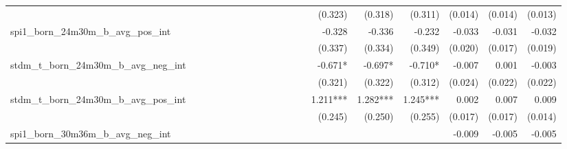 \begin{tabular}{lrrrrrrrrrrrrrrrrrr}
                                            &              &              &              &              &              &              &              &              &               &              &              &               &      (0.323) &      (0.318) &       (0.311) &      (0.014) &      (0.014) &       (0.013) \\ 
spi1\_born\_24m30m\_b\_avg\_pos\_int        &              &              &              &              &              &              &              &              &               &              &              &               &       -0.328 &       -0.336 &        -0.232 &       -0.033 &       -0.031 &        -0.032 \\ 
                                            &              &              &              &              &              &              &              &              &               &              &              &               &      (0.337) &      (0.334) &       (0.349) &      (0.020) &      (0.017) &       (0.019) \\ 
stdm\_t\_born\_24m30m\_b\_avg\_neg\_int     &              &              &              &              &              &              &              &              &               &              &              &               &      -0.671* &      -0.697* &       -0.710* &       -0.007 &        0.001 &        -0.003 \\ 
                                            &              &              &              &              &              &              &              &              &               &              &              &               &      (0.321) &      (0.322) &       (0.312) &      (0.024) &      (0.022) &       (0.022) \\ 
stdm\_t\_born\_24m30m\_b\_avg\_pos\_int     &              &              &              &              &              &              &              &              &               &              &              &               &     1.211*** &     1.282*** &      1.245*** &        0.002 &        0.007 &         0.009 \\ 
                                            &              &              &              &              &              &              &              &              &               &              &              &               &      (0.245) &      (0.250) &       (0.255) &      (0.017) &      (0.017) &       (0.014) \\ 
spi1\_born\_30m36m\_b\_avg\_neg\_int        &              &              &              &              &              &              &              &              &               &              &              &               &              &              &               &       -0.009 &       -0.005 &        -0.005 \\ 

\end{tabular}
